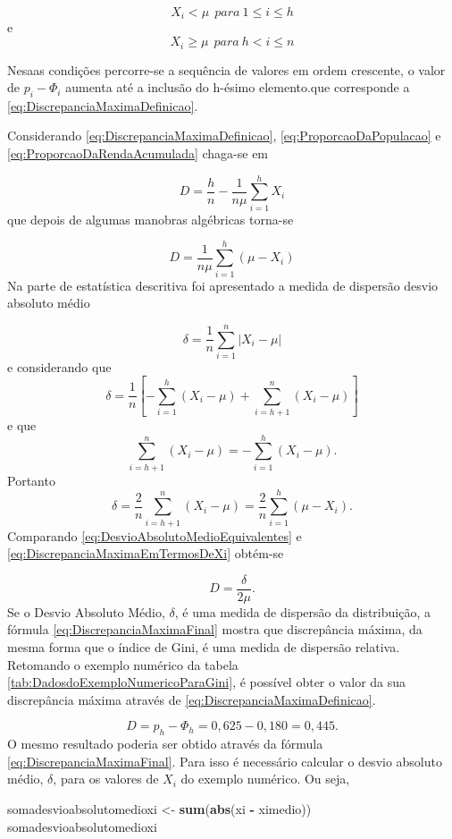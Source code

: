 \documentclass[
]{book}
\newenvironment{Shaded}{\begin{snugshade}}{\end{snugshade}}
\newcommand{\KeywordTok}[1]{\textcolor[rgb]{0.13,0.29,0.53}{\textbf{#1}}}
\newcommand{\NormalTok}[1]{#1}
\newcommand{\OperatorTok}[1]{\textcolor[rgb]{0.81,0.36,0.00}{\textbf{#1}}}
\newcommand{\StringTok}[1]{\textcolor[rgb]{0.31,0.60,0.02}{#1}}
\begin{document}
\[
  X_i < \mu~~para~1 \leq i \leq h
\]
e
\[
  X_i \geq \mu~~para~h < i \leq n
\]

Nesaas condições percorre-se a sequência de valores em ordem crescente, o valor de \(p_i - \Phi_i\) aumenta até a inclusão do h-ésimo elemento.que corresponde a \eqref{eq:DiscrepanciaMaximaDefinicao}.

Considerando \eqref{eq:DiscrepanciaMaximaDefinicao}, \eqref{eq:ProporcaoDaPopulacao} e \eqref{eq:ProporcaoDaRendaAcumulada} chaga-se em

\[
  D = \dfrac{h}{n} - \dfrac{1}{n\mu}\sum_{i=1}^{h}X_i
\]
que depois de algumas manobras algébricas torna-se

\[
  D = \dfrac{1}{n\mu}\sum_{i=1}^{h}(\mu - X_i)
\label{eq:DiscrepanciaMaximaEmTermosDeXi}
\]
Na parte de estatística descritiva foi apresentado a medida de dispersão desvio absoluto médio

\[
  \delta = \dfrac{1}{n}\sum_{i=1}^{n}|X_i - \mu|
\]
e considerando que
\[
  \delta = \dfrac{1}{n}\left[ -\sum_{i=1}^{h}\left(X_i - \mu\right) + \sum_{i=h+1}^{n}\left(X_i - \mu\right)\right]
\]
e que
\[
  \sum_{i=h+1}^{n}\left(X_i - \mu\right) = -\sum_{i=1}^{h}\left(X_i - \mu\right).
\]
Portanto
\[
\delta = \dfrac{2}{n}\sum_{i=h+1}^{n}\left(X_i - \mu\right) = \dfrac{2}{n}\sum_{i=1}^{h}\left(\mu - X_i \right).
\label{eq:DesvioAbsolutoMedioEquivalentes}
\]
Comparando \eqref{eq:DesvioAbsolutoMedioEquivalentes} e \eqref{eq:DiscrepanciaMaximaEmTermosDeXi} obtém-se

\[
D = \dfrac{\delta}{2\mu}.
\label{eq:DiscrepanciaMaximaFinal}
\]
Se o Desvio Absoluto Médio, \(\delta\), é uma medida de dispersão da distribuição, a fórmula \eqref{eq:DiscrepanciaMaximaFinal} mostra que discrepância máxima, da mesma forma que o índice de Gini, é uma medida de dispersão relativa.
Retomando o exemplo numérico da tabela \ref{tab:DadosdoExemploNumericoParaGini}, é possível obter o valor da sua discrepância máxima através de \eqref{eq:DiscrepanciaMaximaDefinicao}.

\[
D = p_h - \Phi_h = 0,625 - 0,180 = 0,445.
\]
O mesmo resultado poderia ser obtido através da fórmula \eqref{eq:DiscrepanciaMaximaFinal}. Para isso é necessário calcular o desvio absoluto médio, \(\delta\), para os valores de \(X_i\) do exemplo numérico. Ou seja,

\begin{Shaded}
\begin{Highlighting}[]
\NormalTok{somadesvioabsolutomedioxi <-}\StringTok{ }\KeywordTok{sum}\NormalTok{(}\KeywordTok{abs}\NormalTok{(xi }\OperatorTok{-}\StringTok{ }\NormalTok{ximedio))}
\NormalTok{somadesvioabsolutomedioxi}
\end{Highlighting}
\end{Shaded}
\end{document}
